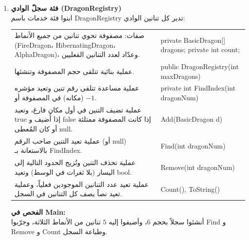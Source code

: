 \documentclass[14pt]{extarticle}
\begin{document}
\begin{enumerate}[label=\textbf{تمرين \arabic*:}, wide=0pt, leftmargin=*, itemsep=2.2em]

    \item \textbf{فئة سجلّ الوادي (\textenglish{DragonRegistry})} \\
    ابنوا فئة خدمات باسم \textenglish{DragonRegistry} تدير كل تنانين الوادي:

    {\centering
    \renewcommand{\arraystretch}{1.2}
    \small
    \begin{tabular}{|>{\raggedleft\arraybackslash}p{}|>{\raggedright\arraybackslash}p{}|}
    \hline
    \multicolumn{2}{|c|}{\textbf{الفئة: \textenglish{DragonRegistry}}} \\
    \hline
    صفات: مصفوفة تحوي تنانين من جميع الأنماط (\textenglish{FireDragon}، \textenglish{HibernatingDragon}، \textenglish{AlphaDragon})، وعدّاد لعدد التنانين الفعليين. & \textenglish{private BasicDragon[] dragons;} \newline \textenglish{private int count;} \\
    \hline
    عملية بنائية تتلقى حجم المصفوفة وتنشئها. & \textenglish{public DragonRegistry(int maxDragons)} \\
    \hline
    عملية مساعدة تتلقى رقم تنين وتعيد مؤشره (مكانه) في المصفوفة أو $-1$. & \textenglish{private int FindIndex(int dragonNum)} \\
    \hline
    عملية تضيف التنين في أول مكان فارغ، وتعيد \textenglish{true} إذا أُضيف و \textenglish{false} إذا كانت المصفوفة ممتلئة أو كان المُعطى \textenglish{null}. & \textenglish{Add(BasicDragon d)} \\
    \hline
    عملية تعيد التنين صاحب الرقم (أو \textenglish{null}) بالاستعانة بـ \textenglish{FindIndex}. & \textenglish{Find(int dragonNum)} \\
    \hline
    عملية تحذف التنين وتُزيح الحدود التالية إلى اليسار (بلا ثغرات في الوسط) وتعيد \textenglish{bool}. & \textenglish{Remove(int dragonNum)} \\
    \hline
    عملية تعيد عدد التنانين الموجودين فعلياً، وعملية تعيد نصاً يصف كل التنانين في السجل. & \textenglish{Count(), ToString()} \\
    \hline
    \end{tabular}
    \par} %

    \vspace{2em}
    \noindent \textbf{الفحص في \textenglish{Main}:} \\
    أنشئوا سجلاً بحجم $6$، وأضيفوا إليه $5$ تنانين من الأنماط الثلاثة، وجرّبوا \textenglish{Find} و \textenglish{Remove} و \textenglish{Count} وطباعة السجل.


\end{enumerate}
\end{document}
